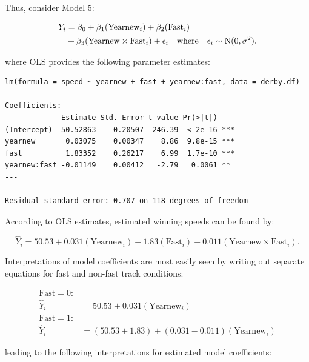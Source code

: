 \documentclass[
]{krantz}
\begin{document}
Thus, consider Model 5:

\begin{equation}
\begin{split}
 Y_{i}&= \beta_{0}+\beta_{1}(\textrm{Yearnew}_{i})+\beta_{2}(\textrm{Fast}_{i}) \notag \\
      &{}+\beta_{3}(\textrm{Yearnew}\times\textrm{Fast}_{i})+\epsilon_{i}\quad \textrm{where}\quad \epsilon_{i}\sim \textrm{N}(0,\sigma^2).
\end{split}
\label{eq:model5}
\end{equation}

where OLS provides the following parameter estimates:

\begin{verbatim}
lm(formula = speed ~ yearnew + fast + yearnew:fast, data = derby.df)

Coefficients:
             Estimate Std. Error t value Pr(>|t|)    
(Intercept)  50.52863    0.20507  246.39  < 2e-16 ***
yearnew       0.03075    0.00347    8.86  9.8e-15 ***
fast          1.83352    0.26217    6.99  1.7e-10 ***
yearnew:fast -0.01149    0.00412   -2.79   0.0061 ** 
---

Residual standard error: 0.707 on 118 degrees of freedom
\end{verbatim}

According to OLS estimates, estimated winning speeds can be found by:

\begin{equation}
 \hat{Y}_{i}=50.53+0.031(\textrm{Yearnew}_{i})+1.83(\textrm{Fast}_{i})-0.011(\textrm{Yearnew}\times\textrm{Fast}_{i}).
\label{eq:model5est}
\end{equation}

Interpretations of model coefficients are most easily seen by writing out separate equations for fast and non-fast track conditions:

\begin{align*}
 \textrm{Fast}=0: & \\
 \hat{Y}_{i} &= 50.53+0.031(\textrm{Yearnew}_{i}) \\
 \textrm{Fast}=1: & \\
 \hat{Y}_{i} &= (50.53+1.83)+(0.031-0.011)(\textrm{Yearnew}_{i})
 \end{align*}

leading to the following interpretations for estimated model coefficients:
\end{document}
